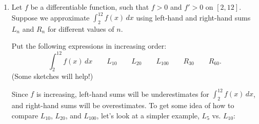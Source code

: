 \documentclass[main]{subfiles}
\begin{document}
\begin{enumerate}[resume]
\begin{enumerate}
    \begin{solution}
      By visualizing these as signed areas, we see that
      \[\boxed{\int_5^{11} r(t)\,dt < \int_5^8 r(t)\,dt= \int_5^{10}
        r(t)\,dt < \int_5^9 r(t)\,dt}.\]
    \end{solution}

  \end{enumerate}

\item 
  \begin{problem}[4in]
    Let $f$ be a differentiable function, such that $f>0$ and $f'>0$ on
    $[2, 12]$.  Suppose we approximate $\displaystyle \int_2^{12} f(x)\,dx$
    using left-hand and right-hand sums $L_n$ and $R_n$ for different
    values of $n$.

    Put the following expressions in increasing order:
    \[ \int_2^{12} f(x)\,dx \qquad L_{10} \qquad L_{20} \qquad L_{100}
    \qquad R_{30} \qquad R_{60}.\] (Some sketches will help!)
  \end{problem}

  \begin{solution}
    Since $f$ is increasing, left-hand sums will be underestimates for
    $\displaystyle \int_2^{12} f(x)\,dx$, and right-hand sums will be
    overestimates.  To get some idea of how to compare $L_{10}$, $L_{20}$,
    and $L_{100}$, let's look at a simpler example, $L_5$ vs. $L_{10}$:
    \begin{center}


\end{center}
\end{solution}
\end{enumerate}
\end{document}
